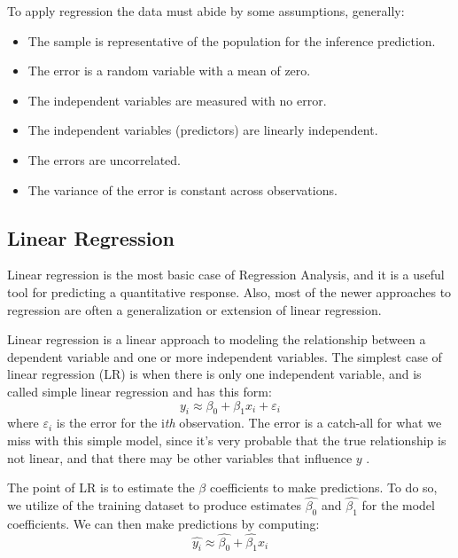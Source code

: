 To apply regression the data must abide by some assumptions, generally:
\begin{itemize}[noitemsep, topsep = -5pt]
	\item The sample is representative of the population for the inference prediction.
	\item The error is a random variable with a mean of zero.
	\item The independent variables are measured with no error.
	\item The independent variables (predictors) are linearly independent.
	\item The errors are uncorrelated.
	\item The variance of the error is constant across observations.
\end{itemize}

\subsection{Linear Regression} \label{lin_reg}
Linear regression is the most basic case of Regression Analysis, and it is a useful tool for predicting a quantitative response. Also, most of the newer approaches to regression are often a generalization or extension of linear regression.

Linear regression is a linear approach to modeling the relationship between a dependent variable and one or more independent variables. The simplest case of linear regression (LR) is when there is only one independent variable, and is called simple linear regression \cite{wiki:lin_reg} and has this form:
\begin{equation}
y_i \approx \beta_0 + \beta_1x_i + \varepsilon_i
\end{equation}
where $\varepsilon_i$ is the error for the i\textit{th} observation. The error is a catch-all for what we miss with this simple model, since it's very probable that the true relationship is not linear, and that there may be other variables that influence $y$ \cite{ISLR}.

The point of LR is to estimate the $\beta$ coefficients to make predictions. To do so, we utilize of the training dataset to produce estimates $\widehat{\beta_0}$ and $\widehat{\beta_1}$ for the model coefficients. We can then make predictions by computing:
\begin{equation}
\widehat{y_i} \approx \widehat{\beta_0} + {\widehat{\beta_1}x_i}
\end{equation}

